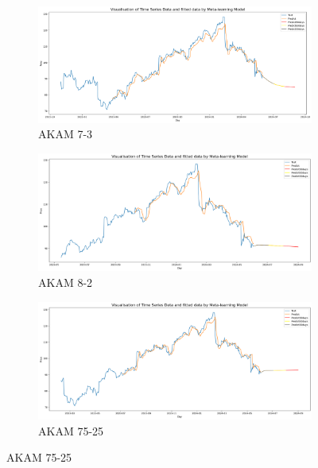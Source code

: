 \documentclass{ieeeojies}
\begin{document}
 \vspace{-10pt}
\begin{figure}[H]
    \centering
    \begin{subfigure}[b]{0.33\linewidth}
        \centering
        \includegraphics[width=\linewidth]{Meta-learning Plot/ML_AKAM_7_3.png}
        \caption{AKAM 7-3}
        \label{fig:akam-7-3}
    \end{subfigure}%
    \hfill
    \begin{subfigure}[b]{0.33\linewidth}
        \centering
        \includegraphics[width=\linewidth]{Meta-learning Plot/ML_AKAM_8_2.png}
        \caption{AKAM 8-2}
        \label{fig:akam-8-2}
    \end{subfigure}%
    \hfill
    \begin{subfigure}[b]{0.33\linewidth}
        \centering
        \includegraphics[width=\linewidth]{Meta-learning Plot/ML_AKAM_75_25.png}
        \caption{AKAM 75-25}
        \label{fig:akam-75-25}
    \end{subfigure}
\end{figure}
\end{document}
